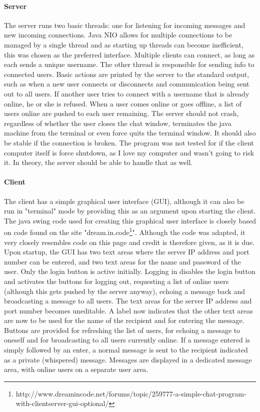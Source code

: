 \documentclass[12pt]{article}
\begin{document}
\paragraph{Server}
The server runs two basic threads:  one for listening for incoming messages and
new incoming connections.  Java NIO allows for multiple connections to be
managed by a single thread and as starting up threads can become inefficient,
this was chosen as the preferred interface. Multiple clients can connect, as
long as each sends a unique username.  The other thread is responsible for
sending info to connected users. Basic actions are printed by the server
to the standard output, such as when a new user connects or disconnects and
communication being sent out to all users.  If another user tries to connect
with a username that is already online, he or she is refused.  When a user comes
online or goes offline, a list of users online are pushed to each user
remaining. The server should not crash,
regardless of whether the user closes the chat window, terminates the java
machine from the terminal or even force quits the terminal window.  It should
also be stable if the connection is broken.  The program was not tested for if
the client computer itself is force shutdown, as I love my computer and wasn't going to
risk it. In theory, the server should be able to handle that as well.

\paragraph{Client}
The client has a simple graphical user interface (GUI), although it can also be run in
"terminal" mode by providing this as an argument upon starting the client.  The
java swing code used for creating this graphical user interface is closely based
on code found on the site
"dream.in.code\footnote{http://www.dreamincode.net/forums/topic/259777-a-simple-chat-program-with-clientserver-gui-optional/}". 
Although the code was adapted, it very closely resembles code on this page and
credit is therefore given, as it is due.  
Upon startup, the GUI has two text areas where the server IP address and port
number can be entered, and two text areas for the name and password of the user.
Only the login button is active initially.  Logging in disables the login button
and activates the buttons for logging out, requesting a list of online users
(although this gets pushed by the server anyway), echoing a message back and
broadcasting a message to all users.  The text areas for the server IP address
and port number becomes uneditable.  A label now indicates that the other text
areas are now to be used for the name of the recipient and for entering the
message.  Buttons are provided for refreshing the list of users, for echoing a
message to oneself and for broadcasting to all users currently online.  If a
message entered is simply followed by an enter, a normal message is sent to the
recipient indicated as a private (whispered) message.  Messages are displayed in
a dedicated message area, with online users on a separate user area.
\end{document}
